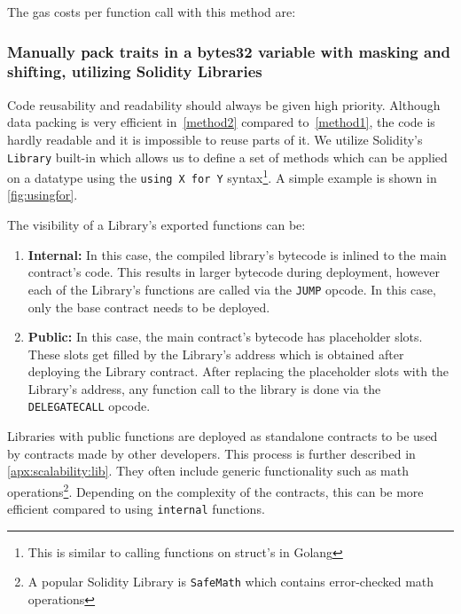 

The gas costs per function call with this method are: 


\subsubsection{Manually pack traits in a bytes32 variable with masking and shifting, utilizing Solidity Libraries} \label{method3}

Code reusability and readability should always be given high priority. Although data packing is very efficient in~\ref{method2} compared to~\ref{method1}, the code is hardly readable and it is impossible to reuse parts of it. %
We utilize Solidity's \texttt{Library} built-in which allows us to define a set of methods which can be applied on a datatype using the \texttt{using X for Y} syntax\footnote{This is similar to calling functions on struct's in Golang}. A simple example is shown in \ref{fig:usingfor}.


The visibility of a Library's exported functions can be: 
\begin{enumerate}
    \item \textbf{Internal:}
        In this case, the compiled library's bytecode is inlined to the main contract's code. This results in larger bytecode during deployment, however each of the Library's functions are called via the \texttt{JUMP} opcode. In this case, only the base contract needs to be deployed.
    \item \textbf{Public:}
        In this case, the main contract's bytecode has placeholder slots. These slots get filled by the Library's address which is obtained after deploying the Library contract. After replacing the placeholder slots with the Library's address, any function call to the library is done via the \texttt{DELEGATECALL} opcode.
\end{enumerate}


Libraries with public functions are deployed as standalone contracts to be used by contracts made by other developers. This process is further described in \ref{apx:scalability:lib}. They often include generic functionality such as math operations\footnote{A popular Solidity Library is \texttt{SafeMath} which contains error-checked math operations}. Depending on the complexity of the contracts, this can be more efficient compared to using \texttt{internal} functions. %

